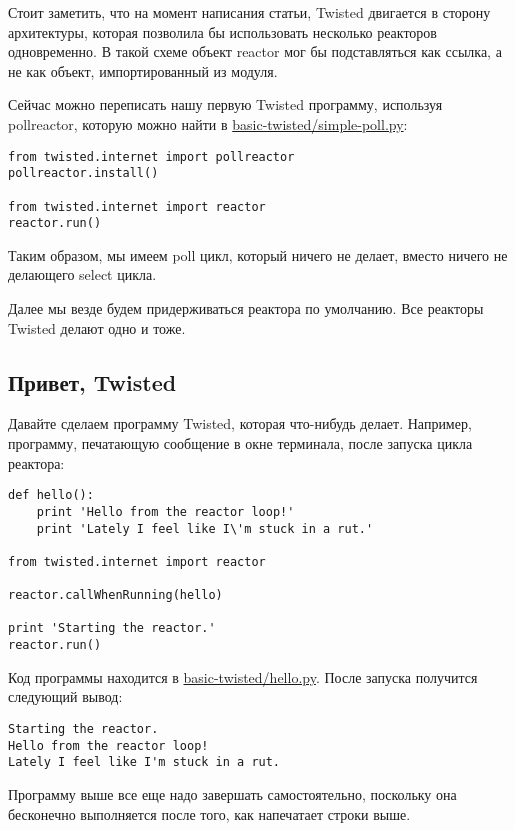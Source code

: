 Стоит заметить, что на момент написания статьи, Twisted двигается в 
сторону архитектуры, которая позволила бы использовать 
несколько реакторов одновременно. В такой схеме объект 
reactor мог бы подставляться как ссылка, а не как объект,  
импортированный из модуля.


Сейчас можно переписать нашу первую Twisted программу, 
используя pollreactor, которую можно найти в 
\href{http://github.com/jdavisp3/twisted-intro/blob/master/basic-twisted/simple-poll.py}{basic-twisted/simple-poll.py}:

 \begin{verbatim}
from twisted.internet import pollreactor
pollreactor.install()

from twisted.internet import reactor
reactor.run()
\end{verbatim} 

Таким образом, мы имеем poll цикл, который ничего не делает, вместо 
ничего не делающего select цикла. 


Далее мы везде будем придерживаться реактора по умолчанию. Все 
реакторы Twisted делают одно и тоже.


\subsection{Привет, Twisted}

Давайте сделаем программу Twisted, которая что-нибудь делает. 
Например, программу, печатающую сообщение в окне терминала, 
после запуска цикла реактора:

 \begin{verbatim}
def hello():
    print 'Hello from the reactor loop!'
    print 'Lately I feel like I\'m stuck in a rut.'

from twisted.internet import reactor

reactor.callWhenRunning(hello)

print 'Starting the reactor.'
reactor.run()
\end{verbatim} 

Код программы находится в 
\href{http://github.com/jdavisp3/twisted-intro/blob/master/basic-twisted/hello.py}{basic-twisted/hello.py}. 
После запуска получится следующий вывод:

 \begin{verbatim}
Starting the reactor.
Hello from the reactor loop!
Lately I feel like I'm stuck in a rut.
\end{verbatim} 

Программу выше все еще надо завершать самостоятельно, 
поскольку она бесконечно выполняется после того, как напечатает 
строки выше.


